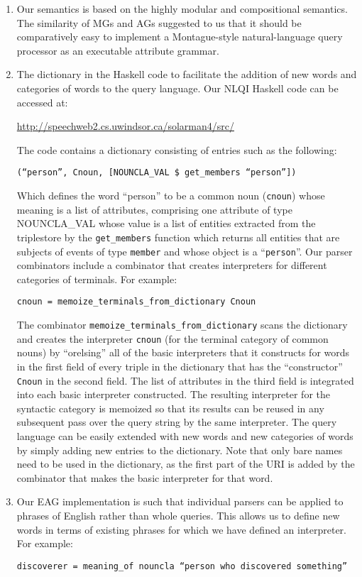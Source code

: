 \documentclass[../main.tex]{subfiles}
\begin{document}
\begin{refsection}
\begin{enumerate}
	\item Our semantics is based on the highly modular and compositional semantics. The similarity of MGs and AGs suggested to us that it should
	be comparatively easy to implement a Montague-style natural-language query processor as an
	executable attribute grammar.

	\item The dictionary in the Haskell code to facilitate the addition of new words and
	categories of words to the query language. Our NLQI Haskell code can be accessed at:
	\begin{center} \url{http://speechweb2.cs.uwindsor.ca/solarman4/src/} \end{center}
	The code contains a dictionary consisting of entries such as the following:
	\begin{center} \texttt{(``person'', Cnoun, [NOUNCLA\_VAL \$ get\_members ``person''])} \end{center}
	Which defines the word ``person'' to be a common noun (\texttt{cnoun}) whose meaning is a
	list of attributes, comprising one attribute of type NOUNCLA\_VAL whose value is a list of
	entities extracted from the triplestore by the \texttt{get\_members} function which returns all entities
	that are subjects of events of type \texttt{member} and whose object is a ``\texttt{person}''. Our parser
	combinators include a combinator that creates interpreters for different categories of terminals.
	For example:
	\begin{center} \texttt{cnoun = memoize\_terminals\_from\_dictionary Cnoun} \end{center}
	The combinator \texttt{memoize\_terminals\_from\_dictionary} scans the dictionary and
	creates the interpreter \texttt{cnoun} (for the terminal category of common nouns) by ``orelsing''
	all of the basic interpreters that it constructs for words in the first field of every triple in the
	dictionary that has the ``constructor'' \texttt{Cnoun} in the second field. The list of attributes in the
	third field is integrated into each basic interpreter constructed. The resulting interpreter for the
	syntactic category is memoized so that its results can be reused in any subsequent pass over the
	query string by the same interpreter.
	The query language can be easily extended with new words and new categories of words by
	simply adding new entries to the dictionary.
	Note that only bare names need to be used in the dictionary, as the first part of the URI is added
	by the combinator that makes the basic interpreter for that word.
	\item Our EAG implementation is such that individual parsers can be applied to phrases of English
	rather than whole queries. This allows us to define new words in terms of existing phrases for
	which we have defined an interpreter. For example:
	\begin{center} \texttt{discoverer = meaning\_of nouncla ``person who discovered something''} \end{center}


\end{enumerate}
\end{refsection}
\end{document}
